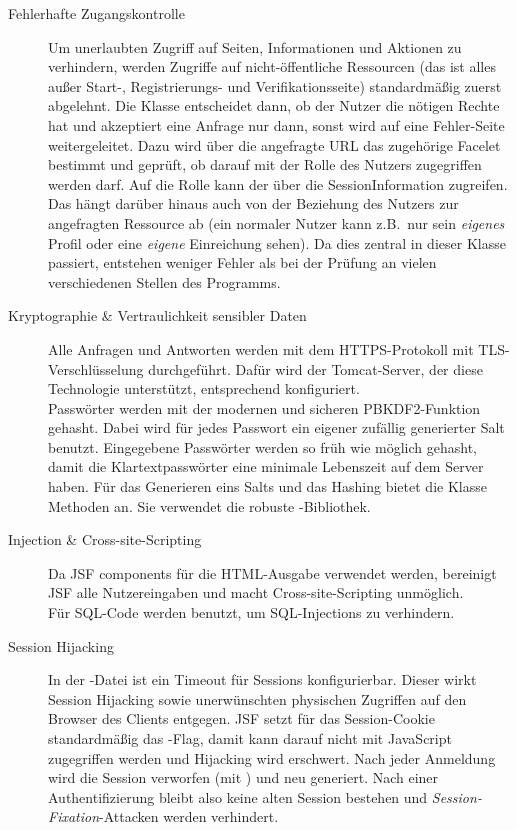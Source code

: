 \begin{description}
\item[Fehlerhafte Zugangskontrolle] 
Um unerlaubten Zugriff auf Seiten, Informationen und Aktionen zu verhindern, werden Zugriffe auf nicht-öffentliche Ressourcen (das ist alles außer Start-, Registrierungs- und Verifikationsseite) standardmäßig zuerst abgelehnt.
Die Klasse  entscheidet dann, ob der Nutzer die nötigen Rechte hat und akzeptiert eine Anfrage nur dann, sonst wird auf eine Fehler-Seite weitergeleitet.
Dazu wird über die angefragte URL das zugehörige Facelet bestimmt und geprüft, ob darauf mit der Rolle des Nutzers zugegriffen werden darf.
Auf die Rolle kann der  über die SessionInformation zugreifen.
Das hängt darüber hinaus auch von der Beziehung des Nutzers zur angefragten Ressource ab (ein normaler Nutzer kann z.B.\ nur sein \emph{eigenes} Profil oder eine \emph{eigene} Einreichung sehen).
Da dies zentral in dieser Klasse passiert, entstehen weniger Fehler als bei der Prüfung an vielen verschiedenen Stellen des Programms.

\item[Kryptographie \& Vertraulichkeit sensibler Daten]
Alle Anfragen und Antworten werden mit dem HTTPS-Protokoll mit TLS-Verschlüsselung durchgeführt.
Dafür wird der Tomcat-Server, der diese Technologie unterstützt, entsprechend konfiguriert.
\\
Passwörter werden mit der modernen und sicheren PBKDF2-Funktion gehasht. Dabei wird für jedes Passwort ein eigener zufällig generierter Salt benutzt.
Eingegebene Passwörter werden so früh wie möglich gehasht, damit die Klartextpasswörter eine minimale Lebenszeit auf dem Server haben.
Für das Generieren eins Salts und das Hashing bietet die Klasse  Methoden an.
Sie verwendet die robuste -Bibliothek.

\item[Injection \& Cross-site-Scripting]
Da JSF components für die HTML-Ausgabe verwendet werden, bereinigt JSF alle Nutzereingaben und macht Cross-site-Scripting unmöglich.
\\
Für SQL-Code werden  benutzt, um SQL-Injections zu verhindern.

\item[Session Hijacking]
In der -Datei ist ein Timeout für Sessions konfigurierbar.
Dieser wirkt Session Hijacking sowie unerwünschten physischen Zugriffen auf den Browser des Clients entgegen.
JSF setzt für das Session-Cookie standardmäßig das -Flag, damit kann darauf nicht mit JavaScript zugegriffen werden und Hijacking wird erschwert.
Nach jeder Anmeldung wird die Session verworfen (mit ) und neu generiert.
Nach einer Authentifizierung bleibt also keine alten Session bestehen und \emph{Session-Fixation}-Attacken werden verhindert.
\end{description}

